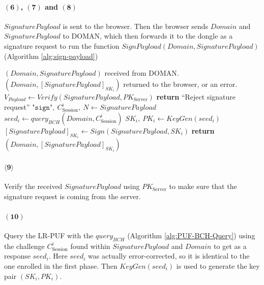 \paragraph{$\boldsymbol{(6)}$, $\boldsymbol{(7)}$ and $\boldsymbol{(8)}$} $SignaturePayload$ is sent to the browser. Then the browser sends $Domain$ and $SignaturePayload$ to DOMAN, which then forwards it to the dongle as a signature request to run the function $SignPayload(Domain, SignaturePayload)$ (Algorithm \ref{alg:sign-payload}) 
\begin{algorithm}[ht!]
\caption{$SignPayload(Domain, SignaturePayload)$}
\begin{algorithmic}[1]
    \Require $(Domain, SignaturePayload)$ received from DOMAN.
    \Ensure  $(Domain, [SignaturePayload]_{SK_i})$ returned to the browser, or an error.
    \State $V_{Payload} \leftarrow Verify(SignaturePayload, PK_{\text{Server}})$
        \State \textbf{return} ``Reject signature request''
    \EndIf
    \State $\texttt{"sign"},\ C^i_{\text{Session}},\ N \leftarrow SignaturePayload$
    \State $seed_i \leftarrow query_{BCH}(Domain, C^i_\text{Session})$ 
    \State $SK_i,\ PK_i \leftarrow KeyGen(seed_i)$
    \State $[SignaturePayload]_{SK_i} \leftarrow Sign(SignaturePayload, SK_i)$
    \State \textbf{return} $(Domain, [SignaturePayload]_{SK_i})$
\end{algorithmic}
\label{alg:sign-payload}
\end{algorithm}

\paragraph{$\boldsymbol{\langle9\rangle}$} Verify the received $SignaturePayload$ using $PK_\text{Server}$ to make sure that the signature request is coming from the server.

\paragraph{$\boldsymbol{(10)}$} Query the LR-PUF with the $query_{BCH}$ (Algorithm \ref{alg:PUF-BCH-Query}) using the challenge $C_\text{Session}^i$ found within $SignaturePayload$ and $Domain$ to get as a response $seed_i$. Here $seed_i$ was actually error-corrected, so it is identical to the one enrolled in the first phase. Then $KeyGen(seed_i)$ is used to generate the key pair $(SK_i, PK_i)$.

